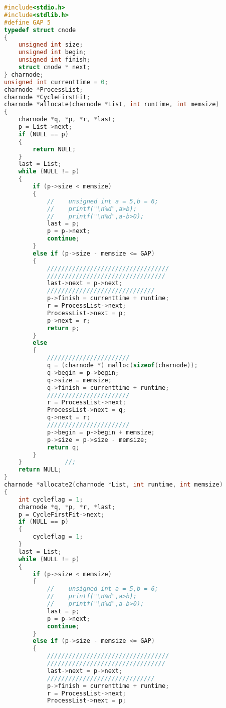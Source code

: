 \documentclass[UTF8]{ctexart}
\begin{document}
\begin{lstlisting}[language = C]
%\begin{verbatim}
#include<stdio.h>
#include<stdlib.h>
#define GAP 5
typedef struct cnode
{
    unsigned int size;
    unsigned int begin;
    unsigned int finish;
    struct cnode * next;
} charnode;
unsigned int currenttime = 0;
charnode *ProcessList;
charnode *CycleFirstFit;
charnode *allocate(charnode *List, int runtime, int memsize)
{
    charnode *q, *p, *r, *last;
    p = List->next;
    if (NULL == p)
    {
        return NULL;
    }
    last = List;
    while (NULL != p)
    {
        if (p->size < memsize)
        {
            //    unsigned int a = 5,b = 6;
            //    printf("\n%d",a>b);
            //    printf("\n%d",a-b>0);
            last = p;
            p = p->next;
            continue;
        }
        else if (p->size - memsize <= GAP)
        {
            //////////////////////////////////
            /////////////////////////////////
            last->next = p->next;
            //////////////////////////////
            p->finish = currenttime + runtime;
            r = ProcessList->next;
            ProcessList->next = p;
            p->next = r;
            return p;
        }
        else
        {
            ///////////////////////
            q = (charnode *) malloc(sizeof(charnode));
            q->begin = p->begin;
            q->size = memsize;
            q->finish = currenttime + runtime;
            ///////////////////////
            r = ProcessList->next;
            ProcessList->next = q;
            q->next = r;
            ///////////////////////
            p->begin = p->begin + memsize;
            p->size = p->size - memsize;
            return q;
        }
    }            //;
    return NULL;
}
charnode *allocate2(charnode *List, int runtime, int memsize)
{
    int cycleflag = 1;
    charnode *q, *p, *r, *last;
    p = CycleFirstFit->next;
    if (NULL == p)
    {
        cycleflag = 1;
    }
    last = List;
    while (NULL != p)
    {
        if (p->size < memsize)
        {
            //    unsigned int a = 5,b = 6;
            //    printf("\n%d",a>b);
            //    printf("\n%d",a-b>0);
            last = p;
            p = p->next;
            continue;
        }
        else if (p->size - memsize <= GAP)
        {
            //////////////////////////////////
            /////////////////////////////////
            last->next = p->next;
            //////////////////////////////
            p->finish = currenttime + runtime;
            r = ProcessList->next;
            ProcessList->next = p;

\end{lstlisting}
\end{document}
